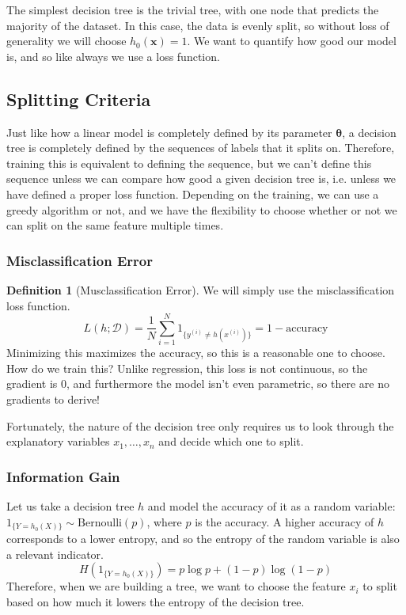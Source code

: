 \documentclass{article}
\theoremstyle{definition}
\theoremstyle{remark}
\theoremstyle{definition}
\newtheorem{definition}{Definition}[section]
\begin{document}
The simplest decision tree is the trivial tree, with one node that predicts the majority of the dataset. In this case, the data is evenly split, so without loss of generality we will choose $h_0 (\mathbf{x}) = 1$. We want to quantify how good our model is, and so like always we use a loss function. 

\subsection{Splitting Criteria}

Just like how a linear model is completely defined by its parameter $\boldsymbol{\theta}$, a decision tree is completely defined by the sequences of labels that it splits on. Therefore, training this is equivalent to defining the sequence, but we can't define this sequence unless we can compare how good a given decision tree is, i.e. unless we have defined a proper loss function. Depending on the training, we can use a greedy algorithm or not, and we have the flexibility to choose whether or not we can split on the same feature multiple times. 

\subsubsection{Misclassification Error}

\begin{definition}[Musclassification Error]
We will simply use the misclassification loss function. 
\[L(h; \mathcal{D}) = \frac{1}{N} \sum_{i=1}^N 1_{\{y^{(i)} \neq h(x^{(i)})\}} = 1 - \text{accuracy}\]
Minimizing this maximizes the accuracy, so this is a reasonable one to choose. How do we train this? Unlike regression, this loss is not continuous, so the gradient is $0$, and furthermore the model isn't even parametric, so there are no gradients to derive! 
\end{definition}

Fortunately, the nature of the decision tree only requires us to look through the explanatory variables $x_1, \ldots, x_n$ and decide which one to split. 

\subsubsection{Information Gain}

Let us take a decision tree $h$ and model the accuracy of it as a random variable: $1_{\{Y = h_0 (X)\}} \sim \mathrm{Bernoulli}(p)$, where $p$ is the accuracy. A higher accuracy of $h$ corresponds to a lower entropy, and so the entropy of the random variable is also a relevant indicator. 
\[H(1_{\{Y = h_0 (X)\}}) = p \log{p} + (1 - p) \log(1 - p)\]
Therefore, when we are building a tree, we want to choose the feature $x_i$ to split based on how much it lowers the entropy of the decision tree. 
\end{document}

